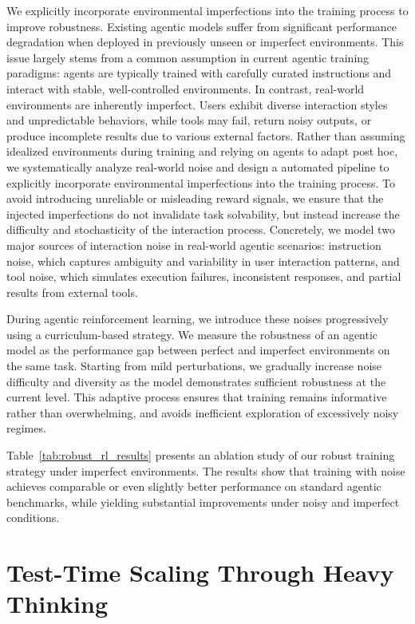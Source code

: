 \documentclass{article}
\begin{document}
We explicitly incorporate environmental imperfections into the training process to improve robustness. 
Existing agentic models suffer from significant performance degradation when deployed in previously unseen or imperfect environments. 
This issue largely stems from a common assumption in current agentic training paradigms: agents are typically trained with carefully curated instructions and interact with stable, well-controlled environments.
In contrast, real-world environments are inherently imperfect. Users exhibit diverse interaction styles and unpredictable behaviors, while tools may fail, return noisy outputs, or produce incomplete results due to various external factors.
Rather than assuming idealized environments during training and relying on agents to adapt post hoc, we systematically analyze real-world noise and design a automated pipeline to explicitly incorporate environmental imperfections into the training process.
To avoid introducing unreliable or misleading reward signals, we ensure that the injected imperfections do not invalidate task solvability, but instead increase the difficulty and stochasticity of the interaction process. 
Concretely, we model two major sources of interaction noise in real-world agentic scenarios: instruction noise, which captures ambiguity and variability in user interaction patterns, and tool noise, which simulates execution failures, inconsistent responses, and partial results from external tools.

During agentic reinforcement learning, we introduce these noises progressively using a curriculum-based strategy.
We measure the robustness of an agentic model as the performance gap between perfect and imperfect environments on the same task.
Starting from mild perturbations, we gradually increase noise difficulty and diversity as the model demonstrates sufficient robustness at the current level.
This adaptive process ensures that training remains informative rather than overwhelming, and avoids inefficient exploration of excessively noisy regimes.

Table~\ref{tab:robust_rl_results} presents an ablation study of our robust training strategy under imperfect environments. 
The results show that training with noise achieves comparable or even slightly better performance on standard agentic benchmarks, while yielding substantial improvements under noisy and imperfect conditions.



\section{Test-Time Scaling Through Heavy Thinking}
\label{sec:post_training_test_time}
\end{document}
